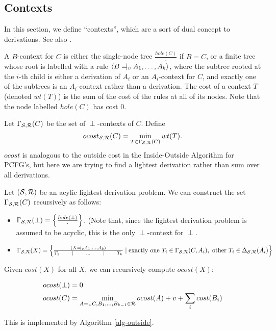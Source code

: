 \subsection{Contexts}

In this section, we define ``contexts'', which are a sort of dual
concept to derivations. See also \cite{astar}.

\begin{defn}
  A $B$-context for $C$ is either the single-node tree
  $\frac{hole(C)}{\cdot}$ if $B=C$, or a finite tree whose root is
  labelled with a rule $ \langle B \tne_v A_1,\dots, A_k \rangle$,
  where the subtree rooted at the $i$-th child is either a derivation
  of $A_i$ or an $A_i$-context for $C$, and exactly one of the
  subtrees is an $A_i$-context rather than a derivation. The cost of a
  context $T$ (denoted $wt(T)$) is the sum of the cost of the rules at
  all of its nodes. Note that the node labelled $hole(C)$ has cost
  $0$.
\end{defn}

Let $\Gamma_{{\mathcal S},{\mathcal R}}(C)$ be the set of $\perp$-contexts of $C$. Define
$$ocost_{{\mathcal S},{\mathcal R}}(C) = \min_{T\in \Gamma_{{\mathcal S},{\mathcal R}}(C)} wt(T).$$
$ocost$ is analogous to the outside cost in the Inside-Outside
Algorithm for PCFG's, but here we are trying to find a lightest
derivation rather than sum over all derivations.

\begin{obs}
\label{prop-outer-set}
Let $({\mathcal S},{\mathcal R})$ be an acylic lightest derivation problem.
We can construct the set $\Gamma_{{\mathcal S},{\mathcal R}}(C)$ recursively as follows:
\begin{itemize}
\item $\Gamma_{{\mathcal S},{\mathcal R}}(\perp) = \left\{ \frac{hole(\perp)}{\cdot}
  \right\}$. (Note that, since the lightest derivation problem is
  assumed to be acyclic, this is the only $\perp$-context for $\perp$.
\item $\Gamma_{\SSS,\RRR}(X) = \left\{ \treee{\langle X \tne_v
      A_1,\dots, A_k \rangle}{T_1}{\dots}{T_k} \mid \mbox{exactly one
    }T_i \in \Gamma_{\SSS,\RRR}(C,A_i), \mbox{ other } T_i \in
    \Delta_{\SSS,\RRR}(A_i) \right\}$
\end{itemize}
\end{obs}

\begin{obs}
\label{obs-outside}
Given $cost(X)$ for all $X$, we can recursively compute $ocost(X)$:

\begin{align*}
ocost(\perp) &= 0\\
ocost(C) &= \min_{A\tne_v C,B_1,\dots,B_{k-1}\in \RRR} ocost(A) + v + \sum_i cost(B_i)\\
\end{align*}

This is implemented by Algorithm \ref{alg-outside}.
\end{obs}

